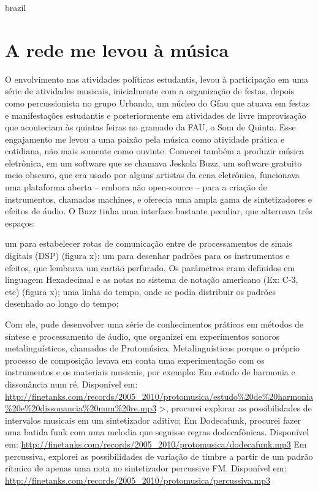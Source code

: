 \begin{otherlanguage*}{brazil}
\section{A rede me levou à música}
O envolvimento nas atividades políticas estudantis, levou à participação em uma série de atividades musicais, inicialmente com a organização de festas, depois como percussionista no grupo Urbando, um núcleo do Gfau que atuava em festas e manifestações estudantis e posteriormente em atividades de livre improvisação que aconteciam às quintas feiras no gramado da FAU, o Som de Quinta. Esse engajamento me levou a uma paixão pela música como atividade prática e cotidiana, não mais somente como ouvinte. 
Comecei também a produzir música eletrônica, em um software que se chamava Jeskola Buzz, um software gratuito meio obscuro, que era usado por alguns artistas da cena eletrônica, funcionava uma plataforma aberta – embora não open-source – para a criação de instrumentos, chamadas machines, e oferecia uma ampla gama de sintetizadores e efeitos de áudio. O Buzz tinha uma interface bastante peculiar, que alternava três espaços:

um para estabelecer rotas de comunicação entre de processamentos de sinais digitais (DSP) (figura x);
um para desenhar padrões para os instrumentos e efeitos, que lembrava um cartão perfurado. Os parâmetros eram definidos em linguagem Hexadecimal e as notas no sistema de notação americano (Ex: C-3, etc) (figura x);
uma linha do tempo, onde se podia distribuir os padrões desenhado ao longo do tempo;

Com ele, pude desenvolver uma série de conhecimentos práticos em métodos de síntese e processamento de áudio, que organizei em experimentos sonoros metalinguísticos, chamados de Protomúsica. Metalinguísticos porque o próprio processo de composição levava em conta uma experimentação com os instrumentos e os materiais musicais, por exemplo:
Em estudo de harmonia e dissonância num ré. Disponível em: \url{http://finetanks.com/records/2005_2010/protomusica/estudo\%20de\%20harmonia\%20e\%20dissonancia\%20num\%20re.mp3} >, procurei explorar as possibilidades de intervalos musicais em um sintetizador aditivo;
Em Dodecafunk, procurei fazer uma batida funk com uma melodia que seguisse regras dodecafônicas. Disponível em: \url{http://finetanks.com/records/2005_2010/protomusica/dodecafunk.mp3}
Em percussiva, explorei as possibilidades de variação de timbre a partir de um padrão rítmico de apenas uma nota no sintetizador percussive FM. Disponível em: \url{http://finetanks.com/records/2005_2010/protomusica/percussiva.mp3}


\end{otherlanguage*}
